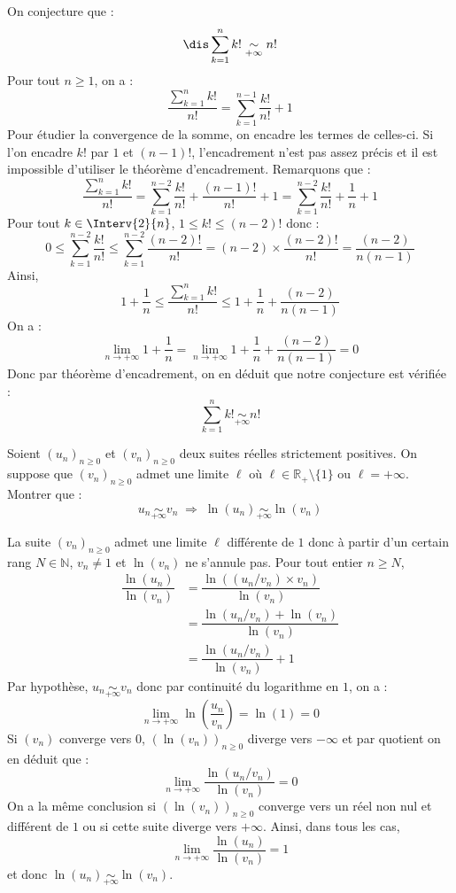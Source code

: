 \documentclass[a4paper,10pt]{report}
\begin{document}
\corr On conjecture que :
$$ \dis \sum_{k=1}^n k! \underset{+ \infty}{\sim} n! $$
Pour tout $n \geq 1$, on a :
$$\dfrac{\sum_{k=1}^n k!}{n!}  = \sum_{k=1}^{n-1} \dfrac{k!}{n!} + 1 $$
Pour étudier la convergence de la somme, on encadre les termes de celles-ci. Si l'on encadre $k!$ par $1$ et $(n-1)!$, l'encadrement n'est pas assez précis et il est impossible d'utiliser le théorème d'encadrement. Remarquons que :
$$ \dfrac{\sum_{k=1}^n k!}{n!}  = \sum_{k=1}^{n-2} \dfrac{k!}{n!} + \dfrac{(n-1)!}{n!} + 1 = \sum_{k=1}^{n-2} \dfrac{k!}{n!} + \dfrac{1}{n} + 1 $$
Pour tout $k \in \Interv{2}{n}$, $1 \leq k! \leq (n-2)!$ donc :
$$ 0 \leq \sum_{k=1}^{n-2} \dfrac{k!}{n!} \leq \sum_{k=1}^{n-2} \dfrac{(n-2)!}{n!} = (n-2) \times \dfrac{(n-2)!}{n!} = \dfrac{(n-2)}{n(n-1)}$$
Ainsi,
$$ 1+ \dfrac{1}{n} \leq \dfrac{\sum_{k=1}^n k!}{n!} \leq 1 + \dfrac{1}{n} + \dfrac{(n-2)}{n(n-1)}$$
On a :
$$ \lim_{n \rightarrow + \infty} 1+ \dfrac{1}{n} =  \lim_{n \rightarrow + \infty} 1+ \dfrac{1}{n} + \dfrac{(n-2)}{n(n-1)} = 0$$
Donc par théorème d'encadrement, on en déduit que notre conjecture est vérifiée :
$$ \sum_{k=1}^n k! \underset{+ \infty}{\sim} n! $$

\medskip

%


\begin{Exa} Soient $(u_n)_{n \geq 0}$ et $(v_n)_{n \geq 0}$ deux suites réelles strictement positives. On suppose que $(v_n)_{n \geq 0}$ admet une limite $\ell$ où $\ell \in \mathbb{R}_+\setminus \lbrace 1 \rbrace$ ou $\ell= + \infty$. Montrer que :
$$ u_n \underset{+ \infty}{\sim} v_n \; \Longrightarrow  \; \ln(u_n) \underset{+ \infty}{\sim} \ln(v_n)$$
\end{Exa}

\corr La suite $(v_n)_{n \geq 0}$ admet une limite $\ell$ différente de $1$ donc à partir d'un certain rang $N \in \mathbb{N}$, $v_n \neq 1$ et $\ln(v_n)$ ne s'annule pas. Pour tout entier $n \geq N$,
\begin{align*}
 \dfrac{\ln(u_n)}{\ln(v_n)} & = \dfrac{\ln((u_n/v_n)\times v_n)}{\ln(v_n)} \\
 & = \dfrac{\ln(u_n/v_n) + \ln(v_n)}{\ln(v_n)} \\
 & = \dfrac{\ln(u_n/v_n)}{\ln(v_n)} + 1 
 \end{align*}
Par hypothèse, $u_n \underset{+ \infty}{\sim} v_n$ donc par continuité du logarithme en $1$, on a :
$$ \lim_{n \rightarrow + \infty} \ln \left( \dfrac{u_n}{v_n} \right) = \ln(1)=0$$
Si $(v_n)$ converge vers $0$, $(\ln(v_n))_{n \geq 0}$ diverge vers $- \infty$ et par quotient on en déduit que :
$$ \lim_{n \rightarrow + \infty} \dfrac{\ln(u_n/v_n)}{\ln(v_n)} = 0$$
On a la même conclusion si $(\ln(v_n))_{n \geq 0}$ converge vers un réel non nul et différent de $1$ ou si cette suite diverge vers $+ \infty$. Ainsi, dans tous les cas, 
$$ \lim_{n \rightarrow + \infty}  \dfrac{\ln(u_n)}{\ln(v_n)} = 1$$
et donc $\ln(u_n) \underset{+ \infty}{\sim} \ln(v_n)$.
\end{document}
